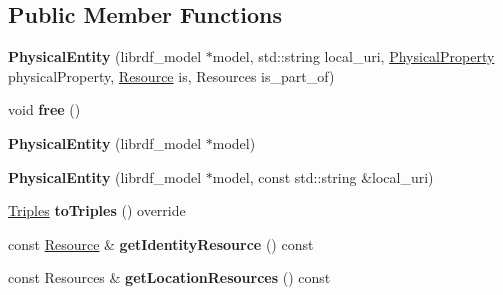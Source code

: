 \subsection*{Public Member Functions}
\begin{DoxyCompactItemize}
\item 
\mbox{\label{classomexmeta_1_1PhysicalEntity_a0cd241da1e0d51f58a1579b21e4e95b1}} 
{\bfseries Physical\+Entity} (librdf\+\_\+model $\ast$model, std\+::string local\+\_\+uri, \hyperlink{classomexmeta_1_1PhysicalProperty}{Physical\+Property} physical\+Property, \hyperlink{classomexmeta_1_1Resource}{Resource} is, Resources is\+\_\+part\+\_\+of)
\item 
\mbox{\label{classomexmeta_1_1PhysicalEntity_a6fd4acd7255a01322c4a53d3e84df0ba}} 
void {\bfseries free} ()
\item 
\mbox{\label{classomexmeta_1_1PhysicalEntity_a6bbbce71778e374de7d4e5e2e674fc2b}} 
{\bfseries Physical\+Entity} (librdf\+\_\+model $\ast$model)
\item 
\mbox{\label{classomexmeta_1_1PhysicalEntity_ab12877c6948f305e8494e69db533cd87}} 
{\bfseries Physical\+Entity} (librdf\+\_\+model $\ast$model, const std\+::string \&local\+\_\+uri)
\item 
\mbox{\label{classomexmeta_1_1PhysicalEntity_a51f5df8b2e8a1d65e5aa0d10e53b77ba}} 
\hyperlink{classomexmeta_1_1Triples}{Triples} {\bfseries to\+Triples} () override
\item 
\mbox{\label{classomexmeta_1_1PhysicalEntity_ae4b3374e9ebb817eb63f9105b491e958}} 
const \hyperlink{classomexmeta_1_1Resource}{Resource} \& {\bfseries get\+Identity\+Resource} () const
\item 
\mbox{\label{classomexmeta_1_1PhysicalEntity_a3e2fba07a4622db0180650d24bf263d9}} 
const Resources \& {\bfseries get\+Location\+Resources} () const
\item 
\mbox{\label{classomexmeta_1_1PhysicalEntity_a5d7168c527d2dbdacd612de37aa9a605}} 

\end{DoxyCompactItemize}
